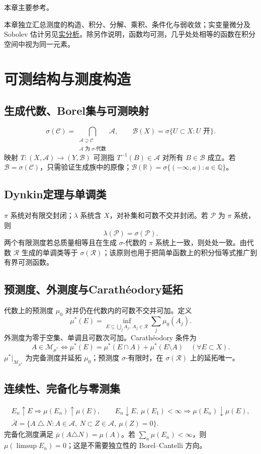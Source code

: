 \documentclass[../main.tex]{subfiles}
\begin{document}
本章主要参考\cite{durrett,brezis}。

本章独立汇总测度的构造、积分、分解、乘积、条件化与弱收敛；实变量微分及 Sobolev 估计另见\hyperref[chap:real-analysis]{实分析}。除另作说明，函数均可测，几乎处处相等的函数在积分空间中视为同一元素。
\section{可测结构与测度构造}
\subsection{生成代数、Borel集与可测映射}
\[
\sigma(\mathcal C)=\bigcap_{\substack{\mathcal A\supseteq\mathcal C\\\mathcal A\text{ 为 }\sigma\text{-代数}}}\mathcal A,
\qquad\mathcal B(X)=\sigma\{U\subset X:U\text{ 开}\}.
\]
映射 $T:(X,\mathcal A)\to(Y,\mathcal B)$ 可测指 $T^{-1}(B)\in\mathcal A$ 对所有 $B\in\mathcal B$ 成立。若 $\mathcal B=\sigma(\mathcal C)$，只需验证生成族中的原像；$\mathcal B(\mathbb R)=\sigma\{(-\infty,a):a\in\mathbb Q\}$。
\subsection{Dynkin定理与单调类}
$\pi$ 系统对有限交封闭；$\lambda$ 系统含 $X$，对补集和可数不交并封闭。若 $\mathcal P$ 为 $\pi$ 系统，则
\[
\lambda(\mathcal P)=\sigma(\mathcal P).
\]
两个有限测度若总质量相等且在生成 $\sigma$-代数的 $\pi$ 系统上一致，则处处一致。由代数 $\mathcal R$ 生成的单调类等于 $\sigma(\mathcal R)$；该原则也用于把简单函数上的积分恒等式推广到有界可测函数。
\subsection{预测度、外测度与Carathéodory延拓}
代数上的预测度 $\mu_0$ 对并仍在代数内的可数不交并可加。定义
\[
\mu^*(E)=\inf_{E\subseteq\bigcup_jA_j,\ A_j\in\mathcal R}\sum_j\mu_0(A_j).
\]
外测度为零于空集、单调且可数次可加。Carathéodory 条件为
\[
A\in\mathcal M_{\mu^*}\iff
\mu^*(E)=\mu^*(E\cap A)+\mu^*(E\setminus A)\quad(\forall E\subset X).
\]
$\mu^*|_{\mathcal M_{\mu^*}}$ 为完备测度并延拓 $\mu_0$；预测度 $\sigma$-有限时，在 $\sigma(\mathcal R)$ 上的延拓唯一。
\subsection{连续性、完备化与零测集}
\begin{gather*}
E_n\uparrow E\Rightarrow\mu(E_n)\uparrow\mu(E),\qquad
E_n\downarrow E,\ \mu(E_1)<\infty\Rightarrow\mu(E_n)\downarrow\mu(E),\\
\bar{\mathcal A}=\{A\mathbin\triangle N:A\in\mathcal A,\ N\subset Z\in\mathcal A,\ \mu(Z)=0\}.
\end{gather*}
完备化测度满足 $\bar\mu(A\triangle N)=\mu(A)$。若 $\sum_n\mu(E_n)<\infty$，则 $\mu(\limsup E_n)=0$；这是不需要独立性的 Borel--Cantelli 方向。
\end{document}
